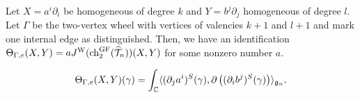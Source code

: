 \documentclass[10pt]{amsart}
\begin{document}
%
%

\begin{prop}
Let $X = a^i \partial_i$ be homogeneous of degree $k$
and $Y = b^j \partial_j$ homogeneous of degree $l$. Let $\Gamma$ be the two-vertex wheel with vertices of valencies $k+1$ and $l+1$ and mark one internal edge as distinguished. Then, we have an identification $\Theta_{\Gamma,e}(X,Y) = a J^{\rm W}({\rm ch}_2^{\rm GF} (\widehat{\mathcal T}_n))(X,Y)$ for some nonzero number $a$. 
\end{prop}

\[
\Theta_{\Gamma,e}(X,Y)(\gamma) = \int_\mathbb C \langle(\partial_j a^i)^S(\gamma), \partial\left( (\partial_i
b^j)^S(\gamma)\right)\rangle_{\mathfrak{g}_n}.
\]
 
\end{document}
